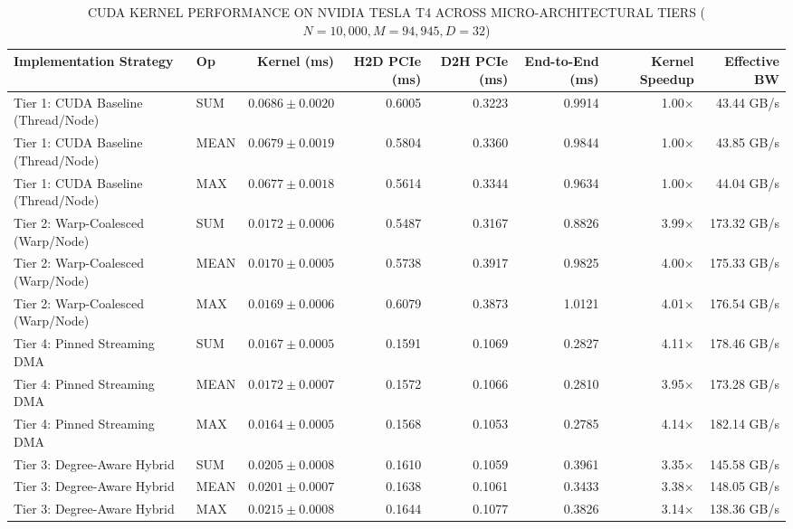 \documentclass[journal]{IEEEtran}
\begin{document}
\begin{table}[!t]
\centering
\caption{CUDA KERNEL PERFORMANCE ON NVIDIA TESLA T4 ACROSS MICRO-ARCHITECTURAL TIERS ($N = 10,000, M = 94,945, D = 32$)}
\label{tab:cuda_tiers}
\begin{tabular}{llrrrrrr}
\toprule
\textbf{Implementation Strategy} & \textbf{Op} & \textbf{Kernel (ms)} & \textbf{H2D PCIe (ms)} & \textbf{D2H PCIe (ms)} & \textbf{End-to-End (ms)} & \textbf{Kernel Speedup} & \textbf{Effective BW} \\
\midrule
Tier 1: CUDA Baseline (Thread/Node) & SUM  & $0.0686 \pm 0.0020$ & 0.6005 & 0.3223 & 0.9914 & 1.00$\times$ & 43.44 GB/s \\
Tier 1: CUDA Baseline (Thread/Node) & MEAN & $0.0679 \pm 0.0019$ & 0.5804 & 0.3360 & 0.9844 & 1.00$\times$ & 43.85 GB/s \\
Tier 1: CUDA Baseline (Thread/Node) & MAX  & $0.0677 \pm 0.0018$ & 0.5614 & 0.3344 & 0.9634 & 1.00$\times$ & 44.04 GB/s \\
\midrule
Tier 2: Warp-Coalesced (Warp/Node)   & SUM  & $0.0172 \pm 0.0006$ & 0.5487 & 0.3167 & 0.8826 & 3.99$\times$ & 173.32 GB/s \\
Tier 2: Warp-Coalesced (Warp/Node)   & MEAN & $0.0170 \pm 0.0005$ & 0.5738 & 0.3917 & 0.9825 & 4.00$\times$ & 175.33 GB/s \\
Tier 2: Warp-Coalesced (Warp/Node)   & MAX  & $0.0169 \pm 0.0006$ & 0.6079 & 0.3873 & 1.0121 & 4.01$\times$ & 176.54 GB/s \\
\midrule
Tier 4: Pinned Streaming DMA         & SUM  & $0.0167 \pm 0.0005$ & 0.1591 & 0.1069 & 0.2827 & 4.11$\times$ & 178.46 GB/s \\
Tier 4: Pinned Streaming DMA         & MEAN & $0.0172 \pm 0.0007$ & 0.1572 & 0.1066 & 0.2810 & 3.95$\times$ & 173.28 GB/s \\
Tier 4: Pinned Streaming DMA         & MAX  & $0.0164 \pm 0.0005$ & 0.1568 & 0.1053 & 0.2785 & 4.14$\times$ & 182.14 GB/s \\
\midrule
Tier 3: Degree-Aware Hybrid          & SUM  & $0.0205 \pm 0.0008$ & 0.1610 & 0.1059 & 0.3961 & 3.35$\times$ & 145.58 GB/s \\
Tier 3: Degree-Aware Hybrid          & MEAN & $0.0201 \pm 0.0007$ & 0.1638 & 0.1061 & 0.3433 & 3.38$\times$ & 148.05 GB/s \\
Tier 3: Degree-Aware Hybrid          & MAX  & $0.0215 \pm 0.0008$ & 0.1644 & 0.1077 & 0.3826 & 3.14$\times$ & 138.36 GB/s \\
\bottomrule
\end{tabular}
\end{table}
\end{document}
